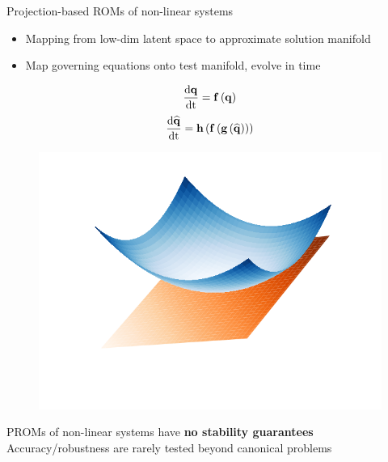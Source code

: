 \documentclass[]{beamer}
\begin{document}
\begin{frame}{Projection-based ROMs of non-linear systems}
    \begin{itemize}
        \item Mapping from low-dim latent space to approximate solution manifold
        \item Map governing equations onto test manifold, evolve in time
    \end{itemize}
	\centering
	\begin{minipage}{0.49\linewidth}
		\centering
		\vspace{-2em}
		\begin{equation*}
			\frac{\text{d} \mathbf{q}}{\text{d} \text{t}} = \mathbf{f} \left(\mathbf{q}\right)
		\end{equation*}
		\begin{equation*}
			\frac{\text{d} \mathbf{\widehat{q}}}{\text{d} \text{t}} = \mathbf{h}\left(\mathbf{f} \left(\mathbf{g}\left(\mathbf{\widehat{q}}\right)\right)\right)
		\end{equation*}
	\end{minipage}
	\hspace{-2em}
	\begin{minipage}{0.49\linewidth}
		\begin{figure}
			\includegraphics[width=0.99\linewidth,trim={2em 2em 2em 2em},clip]{tangentPlane.png}
		\end{figure}
	\end{minipage}
	\begin{tcolorbox}[colframe=red!50!white,halign=center]
		PROMs of non-linear systems have \textbf{no stability guarantees} \\
		Accuracy/robustness are rarely tested beyond canonical problems
	\end{tcolorbox}
\end{frame}
\end{document}
